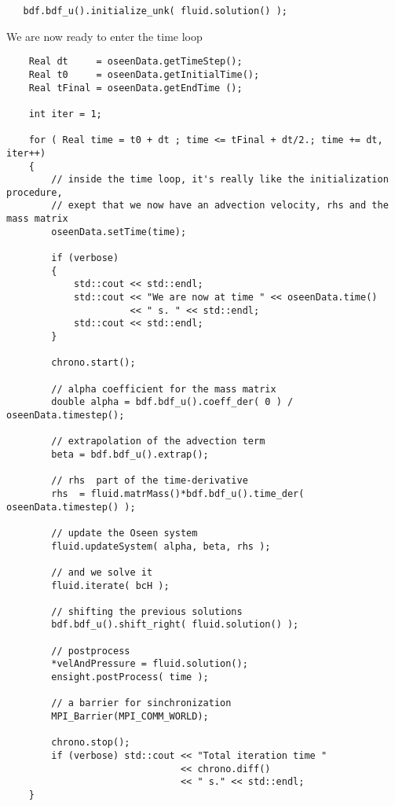 \begin{verbatim}
   bdf.bdf_u().initialize_unk( fluid.solution() );
\end{verbatim}

We are now ready to enter the time loop 

\begin{verbatim}
    Real dt     = oseenData.getTimeStep();
    Real t0     = oseenData.getInitialTime();
    Real tFinal = oseenData.getEndTime ();

    int iter = 1;

    for ( Real time = t0 + dt ; time <= tFinal + dt/2.; time += dt, iter++)
    {
        // inside the time loop, it's really like the initialization procedure,
        // exept that we now have an advection velocity, rhs and the mass matrix
        oseenData.setTime(time);

        if (verbose)
        {
            std::cout << std::endl;
            std::cout << "We are now at time " << oseenData.time()
                      << " s. " << std::endl;
            std::cout << std::endl;
        }

        chrono.start();

        // alpha coefficient for the mass matrix
        double alpha = bdf.bdf_u().coeff_der( 0 ) / oseenData.timestep();

        // extrapolation of the advection term
        beta = bdf.bdf_u().extrap();

        // rhs  part of the time-derivative
        rhs  = fluid.matrMass()*bdf.bdf_u().time_der( oseenData.timestep() );

        // update the Oseen system
        fluid.updateSystem( alpha, beta, rhs );

        // and we solve it
        fluid.iterate( bcH );

        // shifting the previous solutions
        bdf.bdf_u().shift_right( fluid.solution() );

        // postprocess
        *velAndPressure = fluid.solution();
        ensight.postProcess( time );

        // a barrier for sinchronization 
        MPI_Barrier(MPI_COMM_WORLD);

        chrono.stop();
        if (verbose) std::cout << "Total iteration time "
                               << chrono.diff()
                               << " s." << std::endl;
    }

\end{verbatim}


